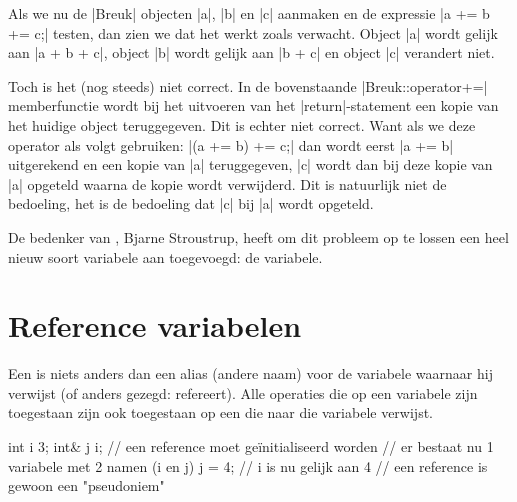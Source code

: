 \begin{cpplstShortInline}
Als we nu de |Breuk| objecten |a|, |b| en |c| aanmaken en de expressie |a += b += c;| testen, dan zien we dat het werkt zoals verwacht. 
Object |a| wordt gelijk aan |a + b + c|, object |b| wordt gelijk aan |b + c| en object |c| verandert niet.

Toch is het (nog steeds) niet correct. In de bovenstaande |Breuk::operator+=| memberfunctie wordt bij het uitvoeren van het |return|\hyp{}statement een kopie van het huidige object teruggegeven. 
Dit is echter niet correct. 
Want als we deze operator als volgt gebruiken: |(a += b) += c;| dan wordt eerst |a += b| uitgerekend en een kopie van |a| teruggegeven, |c| wordt dan bij deze kopie van |a| opgeteld waarna de kopie wordt verwijderd. 
Dit is natuurlijk niet de bedoeling, het is de bedoeling dat |c| bij |a| wordt opgeteld.

De bedenker van \Cpp{}, Bjarne Stroustrup, heeft om dit probleem op te lossen een heel nieuw soort variabele aan \Cpp{} toegevoegd: de \emph{} variabele.

\section{Reference variabelen}
Een \label{reference}\emph{} is niets anders dan een alias (andere naam) voor de variabele waarnaar hij verwijst (of anders gezegd: refereert). 
Alle operaties die op een variabele zijn toegestaan zijn ook toegestaan op een  die naar die variabele verwijst.

\begin{cpplstfragment}
    int i {3};
    int& j {i}; // een reference moet geïnitialiseerd worden
                // er bestaat nu 1 variabele met 2 namen (i en j)
    j = 4;      // i is nu gelijk aan 4
                // een reference is gewoon een "pseudoniem"
\end{cpplstfragment}


\end{cpplstShortInline}
